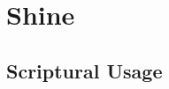 \section{Shine}
	\label{SHINE}
	





\subsection{Scriptural Usage} %
	\label{SHINE-SCRIPTURES}

	
	
